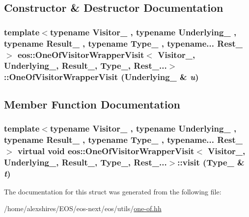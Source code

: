 \subsection{Constructor \& Destructor Documentation}
\hypertarget{structeos_1_1OneOfVisitorWrapperVisit_3_01Visitor___00_01Underlying___00_01Result___00_01Type___00_01Rest___8_8_8_4_a6dcaea16ba357d802503c53cf87f23c7}{
\subsubsection[{OneOfVisitorWrapperVisit}]{\setlength{\rightskip}{0pt plus 5cm}template$<$typename Visitor\_\- , typename Underlying\_\- , typename Result\_\- , typename Type\_\- , typename... Rest\_\-$>$ eos::OneOfVisitorWrapperVisit$<$ Visitor\_\-, Underlying\_\-, Result\_\-, Type\_\-, Rest\_\-...$>$::OneOfVisitorWrapperVisit (Underlying\_\- \& {\em u})}}
\label{structeos_1_1OneOfVisitorWrapperVisit_3_01Visitor___00_01Underlying___00_01Result___00_01Type___00_01Rest___8_8_8_4_a6dcaea16ba357d802503c53cf87f23c7}


\subsection{Member Function Documentation}
\hypertarget{structeos_1_1OneOfVisitorWrapperVisit_3_01Visitor___00_01Underlying___00_01Result___00_01Type___00_01Rest___8_8_8_4_a863282de1b7dca811be133475d78b6ef}{
\subsubsection[{visit}]{\setlength{\rightskip}{0pt plus 5cm}template$<$typename Visitor\_\- , typename Underlying\_\- , typename Result\_\- , typename Type\_\- , typename... Rest\_\-$>$ virtual void eos::OneOfVisitorWrapperVisit$<$ Visitor\_\-, Underlying\_\-, Result\_\-, Type\_\-, Rest\_\-...$>$::visit (Type\_\- \& {\em t})}}
\label{structeos_1_1OneOfVisitorWrapperVisit_3_01Visitor___00_01Underlying___00_01Result___00_01Type___00_01Rest___8_8_8_4_a863282de1b7dca811be133475d78b6ef}


The documentation for this struct was generated from the following file:\begin{DoxyCompactItemize}
\item 
/home/alexshires/EOS/eos-\/next/eos/utils/\hyperlink{one-of_8hh}{one-\/of.hh}\end{DoxyCompactItemize}

